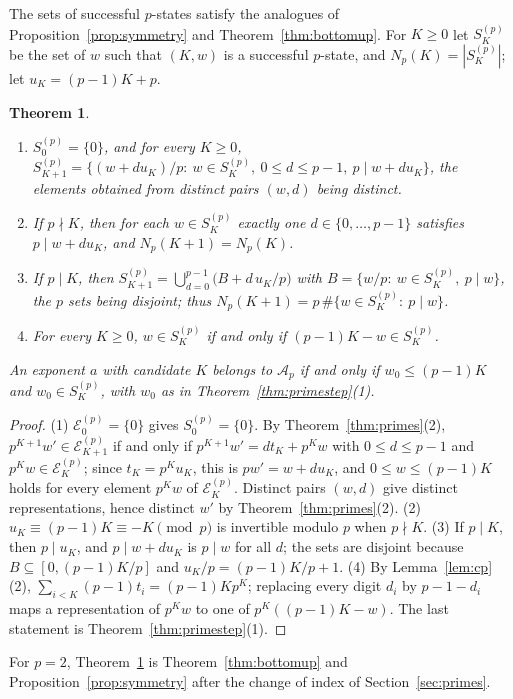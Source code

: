 \documentclass[11pt]{amsart}
\newtheorem{Theorem}{Theorem}[section]
\theoremstyle{definition}
\begin{document}
The sets of successful $p$-states satisfy the analogues of Proposition~\ref{prop:symmetry} and Theorem~\ref{thm:bottomup}. For $K\ge0$ let $S^{(p)}_K$ be the set of $w$ such that $(K,w)$ is a successful $p$-state, and $N_p(K)=|S^{(p)}_K|$; let $u_K=(p-1)K+p$.

\begin{Theorem}
\label{thm:primebottomup}
\begin{enumerate}
\item $S^{(p)}_0=\{0\}$, and for every $K\ge0$, $S^{(p)}_{K+1}=\{(w+du_K)/p:\ w\in S^{(p)}_K,\ 0\le d\le p-1,\ p\mid w+du_K\}$, the elements obtained from distinct pairs $(w,d)$ being distinct.
\item If $p\nmid K$, then for each $w\in S^{(p)}_K$ exactly one $d\in\{0,\dots,p-1\}$ satisfies $p\mid w+du_K$, and $N_p(K+1)=N_p(K)$.
\item If $p\mid K$, then $S^{(p)}_{K+1}=\bigcup_{d=0}^{p-1}\bigl(B+d\,u_K/p\bigr)$ with $B=\{w/p:\ w\in S^{(p)}_K,\ p\mid w\}$, the $p$ sets being disjoint; thus $N_p(K+1)=p\,\#\{w\in S^{(p)}_K:\ p\mid w\}$.
\item For every $K\ge0$, $w\in S^{(p)}_K$ if and only if $(p-1)K-w\in S^{(p)}_K$.
\end{enumerate}
An exponent $a$ with candidate $K$ belongs to $\mathcal{A}_p$ if and only if $w_0\le(p-1)K$ and $w_0\in S^{(p)}_K$, with $w_0$ as in Theorem~\ref{thm:primestep}(1).
\end{Theorem}
\begin{proof}
(1) $\mathcal{E}^{(p)}_0=\{0\}$ gives $S^{(p)}_0=\{0\}$. By Theorem~\ref{thm:primes}(2), $p^{K+1}w'\in\mathcal{E}^{(p)}_{K+1}$ if and only if $p^{K+1}w'=dt_K+p^Kw$ with $0\le d\le p-1$ and $p^Kw\in\mathcal{E}^{(p)}_K$; since $t_K=p^Ku_K$, this is $pw'=w+du_K$, and $0\le w\le(p-1)K$ holds for every element $p^Kw$ of $\mathcal{E}^{(p)}_K$. Distinct pairs $(w,d)$ give distinct representations, hence distinct $w'$ by Theorem~\ref{thm:primes}(2). (2) $u_K\equiv(p-1)K\equiv-K\pmod p$ is invertible modulo $p$ when $p\nmid K$. (3) If $p\mid K$, then $p\mid u_K$, and $p\mid w+du_K$ is $p\mid w$ for all $d$; the sets are disjoint because $B\subseteq[0,(p-1)K/p]$ and $u_K/p=(p-1)K/p+1$. (4) By Lemma~\ref{lem:cp}(2), $\sum_{i<K}(p-1)t_i=(p-1)Kp^K$; replacing every digit $d_i$ by $p-1-d_i$ maps a representation of $p^Kw$ to one of $p^K((p-1)K-w)$. The last statement is Theorem~\ref{thm:primestep}(1).
\end{proof}

For $p=2$, Theorem~\ref{thm:primebottomup} is Theorem~\ref{thm:bottomup} and Proposition~\ref{prop:symmetry} after the change of index of Section~\ref{sec:primes}.
\end{document}
